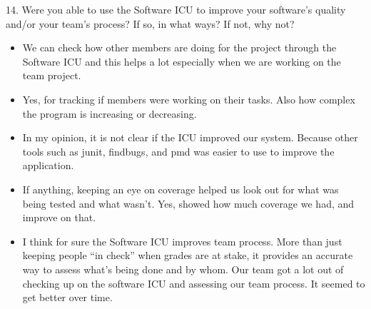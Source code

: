 14. Were you able to use the Software ICU to improve your software's quality and/or your team's process? If so, in what ways? If not, why not? 
\begin{itemize}
\item We can check how other members are doing for the project through the Software ICU and this helps a lot especially when we are working on the team project. 
\item Yes, for tracking if members were working on their tasks. Also how complex the program is increasing or decreasing. 
\item In my opinion, it is not clear if the ICU improved our system.  Because other tools such as junit, findbugs, and pmd was easier to use to improve the application.
\item If anything, keeping an eye on coverage helped us look out for what was being tested and what wasn't.
Yes, showed how much coverage we had, and improve on that.
\item I think for sure the Software ICU improves team process. More than just keeping people ``in check'' when grades are at stake, it provides an accurate way to assess what's being done and by whom. Our team got a lot out of checking up on the software ICU and assessing our team process. It seemed to get better over time.


\end{itemize}
